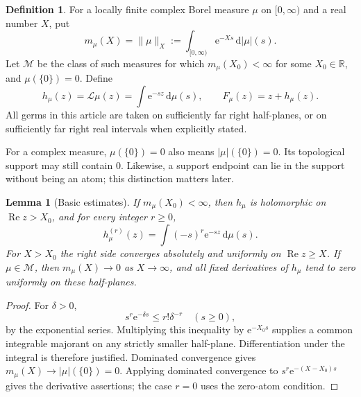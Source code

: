 \documentclass[11pt,a4paper]{article}
\newtheorem{lemma}[theorem]{Lemma}
\theoremstyle{definition}
\newtheorem{definition}[theorem]{Definition}
\theoremstyle{remark}
\newcommand{\R}{\mathbb R}
\newcommand{\Lap}{\mathcal L}
\newcommand{\dd}{\,\mathrm d}
\newcommand{\e}{\mathrm e}
\newcommand{\Rea}{\operatorname{Re}}
\newcommand{\normx}[2]{\lVert #1\rVert_{#2}}
\numberwithin{equation}{section}
\begin{document}
\begin{definition}
For a locally finite complex Borel measure $\mu$ on $[0,\infty)$ and a real number $X$, put
\begin{equation}\label{eq:norm}
 m_\mu(X)=\normx{\mu}{X}:=\int_{[0,\infty)}\e^{-Xs}\dd|\mu|(s).
\end{equation}
Let $\mathcal M$ be the class of such measures for which $m_\mu(X_0)<\infty$ for some $X_0\in\R$, and $\mu(\{0\})=0$. Define
\begin{equation}\label{eq:lap}
 h_\mu(z)=\Lap\mu(z)=\int\e^{-sz}\dd\mu(s),
 \qquad F_\mu(z)=z+h_\mu(z).
\end{equation}
All germs in this article are taken on sufficiently far right half-planes, or on sufficiently far right real intervals when explicitly stated.
\end{definition}
For a complex measure, $\mu(\{0\})=0$ also means $|\mu|(\{0\})=0$. Its topological support may still contain $0$. Likewise, a support endpoint can lie in the support without being an atom; this distinction matters later.

\begin{lemma}[Basic estimates]\label{lem:basic}
If $m_\mu(X_0)<\infty$, then $h_\mu$ is holomorphic on $\Rea z>X_0$, and for every integer $r\ge0$,
\begin{equation}\label{eq:derivative}
 h_\mu^{(r)}(z)=\int(-s)^r\e^{-sz}\dd\mu(s).
\end{equation}
For $X>X_0$ the right side converges absolutely and uniformly on $\Rea z\ge X$. If $\mu\in\mathcal M$, then $m_\mu(X)\to0$ as $X\to\infty$, and all fixed derivatives of $h_\mu$ tend to zero uniformly on these half-planes.
\end{lemma}
\begin{proof}
For $\delta>0$,
\[
 s^r\e^{-\delta s}\le r!\delta^{-r}\quad(s\ge0),
\]
by the exponential series. Multiplying this inequality by $\e^{-X_0s}$ supplies a common integrable majorant on any strictly smaller half-plane. Differentiation under the integral is therefore justified. Dominated convergence gives $m_\mu(X)\to |\mu|(\{0\})=0$. Applying dominated convergence to $s^r\e^{-(X-X_0)s}$ gives the derivative assertions; the case $r=0$ uses the zero-atom condition.
\end{proof}
\end{document}

